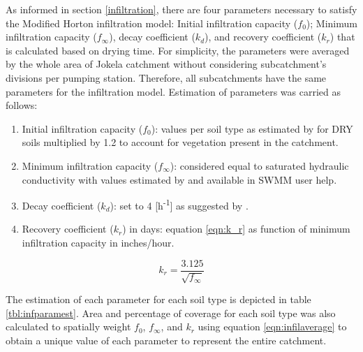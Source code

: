 As informed in section \ref{infiltration}, there are four parameters necessary to satisfy the Modified Horton infiltration model: Initial infiltration capacity ($f_0$); Minimum infiltration capacity ($f_\infty$), decay coefficient ($k_d$), and recovery coefficient ($k_r$) that is calculated based on drying time. For simplicity, the parameters were averaged by the whole area of Jokela catchment without considering subcatchment's divisions per pumping station. Therefore, all subcatchments have the same parameters for the infiltration model. Estimation of parameters was carried as follows:
\begin{enumerate}
    \item Initial infiltration capacity ($f_0$): values per soil type as estimated by \citet{Rossman2016} for DRY soils multiplied by 1.2 to account for vegetation present in the catchment.
    \item Minimum infiltration capacity ($f_\infty$): considered equal to saturated hydraulic conductivity with values estimated by \citet{Rawls1983} and available in SWMM user help.
    \item Decay coefficient ($k_d$): set to 4 [h\textsuperscript{-1}] as suggested by \citet{Rossman2016}.
    \item Recovery coefficient ($k_r$) in days: equation \ref{eqn:k_r} as function of minimum infiltration capacity in inches/hour.
\end{enumerate}

\begin{equation}
\label{eqn:k_r}
k_r = \frac{3.125}{\sqrt{f_\infty}}
\end{equation}


The estimation of each parameter for each soil type is depicted in table \ref{tbl:infparamest}. Area and percentage of coverage for each soil type was also calculated to spatially weight $f_0$, $f_\infty$, and $k_r$ using equation \ref{eqn:infilaverage} to obtain a unique value of each parameter to represent the entire catchment.


